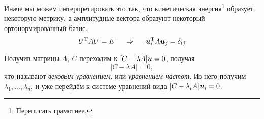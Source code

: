 Иначе мы можем интерпретировать это так, что кинетическая энергия\footnote{
    Переписать грамотнее.
} образует некоторую метрику, а амплитудные вектора образуют некоторый ортонормированный базис.
\begin{equation*}
    U^{\text{T}} A U = E
    \hspace{0.5cm} \Rightarrow \hspace{0.5cm}
    \mbox{\boldmath $u$}^{\text{T}}_i A \mbox{\boldmath $u$}_j = \delta_{ij}
\end{equation*}



Получив матрицы $A, \ C$ переходим к $[C - \lambda A] \mbox{\boldmath $u$} = 0$, получая
\begin{equation*}
    | C - \lambda A| = 0,
\end{equation*}
что называют \textit{вековым уравнением}, или \textit{уравнением частот}. Из него получим $\lambda_1, \ldots, \lambda_n$,  и уже перейдём к системе уравнений вида $|C - \lambda_i A| \mbox{\boldmath $u$}_i = 0$.


